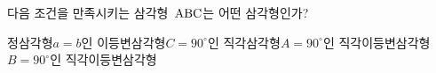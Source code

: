 다음 조건을 만족시키는 삼각형~$\mathrm{ABC}$는 어떤 삼각형인가? 
\begin{choicesv}{정삼각형}{$a=b$인 이등변삼각형}{$C=90^\circ$인 직각삼각형}{$A=90^\circ$인 직각이등변삼각형}{$B=90^\circ$인 직각이등변삼각형}\end{choicesv}
